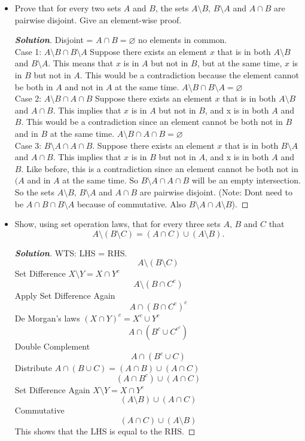 \documentclass[11pt]{article}
\newenvironment{problem}[2][Problem\!]{\begin{trivlist}
\item[\hskip \labelsep {\bfseries #1}\hskip \labelsep {\bfseries #2.}]}{\end{trivlist}}
\newenvironment{solution}{\begin{proof}[\textbf{\textit{Solution}}]}{\end{proof}}
\renewcommand{\emptyset}{\varnothing}
\begin{document}
\begin{problem}{4.3}\hfill
\begin{itemize}[itemsep=3em]
\item[(a)] Prove that for every two sets $A$ and $B$, the sets $A \setminus B,\, B \setminus A$ and $A \cap B$ are pairwise disjoint. Give an element-wise proof.
\begin{solution}
Disjoint = \(A \cap B = \emptyset\) no elements in common.\\
Case 1: \(A \setminus B \cap B \setminus A\)
Suppose there exists an element \(x\) that is in both \(A \setminus B\) and \(B \setminus A\). This means that \(x\) is in \(A\) but not in \(B\), but at the same time, \(x\) is in \(B\) but not in \(A\). This would be a contradiction because the element cannot be both in \(A\) and not in \(A\) at the same time. \(A \setminus B \cap B \setminus A = \emptyset\)\\
Case 2: \(A \setminus B \cap A \cap B\)
Suppose there exists an element \(x\) that is in both \(A \setminus B\) and \(A \cap B\). This implies that \(x\) is in \(A\) but not in \(B\), and x is in both \(A\) and \(B\). This would be a contradiction since an element cannot be both not in \(B\) and in \(B\) at the same time. \(A \setminus B \cap A \cap B = \emptyset\)\\
Case 3: \(B \setminus A \cap A \cap B\).
Suppose there exists an element \(x\) that is in both \(B \setminus A\) and \(A \cap B\). This implies that \(x\) is in \(B\) but not in \(A\), and x is in both \(A\) and \(B\). Like before, this is a contradiction since an element cannot be both not in \((A\) and in \(A\) at the same time. So \(B \setminus A \cap A \cap B\) will be an empty intersection.
So the sets $A \setminus B,\, B \setminus A$ and $A \cap B$ are pairwise disjoint.
(Note: Dont need to be \(A \cap B \cap B \setminus A\) because of commutative. Also \(B \setminus A \cap A \setminus B\)).
\end{solution}

\item[(b)] Show, using set operation laws, that for every three sets $A,\, B$ and $C$ that \[A \setminus (B \setminus C) = (A \cap C) \cup (A \setminus B).\]
\begin{solution}
WTS: LHS = RHS.
\[A \setminus (B \setminus C)\]
Set Difference \(X \setminus Y = X \cap Y^c\)
\[A \setminus (B \cap C^c)\]
Apply Set Difference Again
\[A \cap (B \cap C^c)^c\]
De Morgan's laws \((X \cap Y)^c = X^c \cup Y^c\)
\[A \cap (B^c \cup C^{c^{c}})\]
Double Complement
\[A \cap (B^c \cup C)\]
Distribute \(A \cap(B \cup C) = (A \cap B) \cup (A \cap C)\)
\[(A \cap B^c) \cup (A \cap C)\]
Set Difference Again \(X \setminus Y = X \cap Y^c\)
\[(A \setminus B) \cup (A \cap C)\]
Commutative
\[(A \cap C) \cup (A \setminus B)\]
This shows that the LHS is equal to the RHS.
\end{solution}

\end{itemize}
\end{problem}
\end{document}
